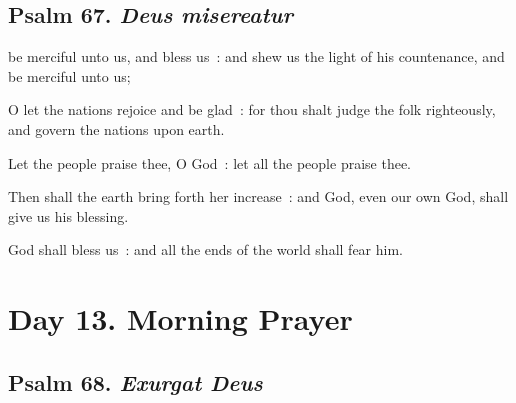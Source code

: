 \subsection{Psalm 67. \textit{Deus misereatur}}


 be merciful unto us, and bless us~: and shew us the light of his countenance, and be merciful unto us;\par
{}
O let the nations rejoice and be glad~: for thou shalt judge the folk righteously, and govern the nations upon earth.\par
{}Let the people praise thee, O God~: let all the people praise thee.\par
{}Then shall the earth bring forth her increase~: and God, even our own God, shall give us his blessing.\par
{}God shall bless us~: and all the ends of the world shall fear him.\par

\section*{Day 13. Morning Prayer}

\subsection{Psalm 68. \textit{Exurgat Deus}}


